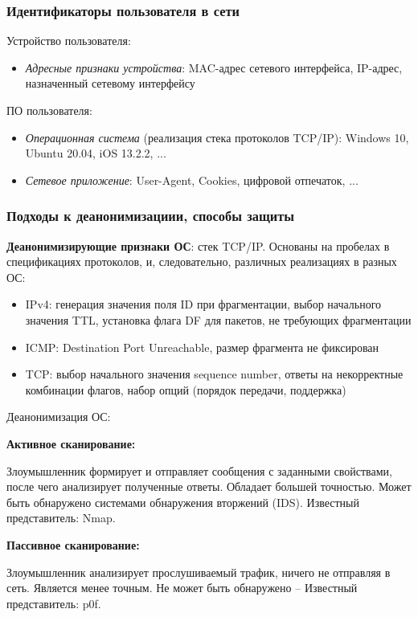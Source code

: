 \subsubsection{Идентификаторы пользователя в сети}

Устройство пользователя:
\begin{itemize}
    \item \textit{Адресные признаки устройства}: MAC-адрес сетевого интерфейса, IP-адрес, назначенный сетевому интерфейсу
\end{itemize}

ПО пользователя:
\begin{itemize}
    \item \textit{Операционная система} (реализация стека протоколов TCP/IP): Windows 10, Ubuntu 20.04, iOS 13.2.2, ...
    \item \textit{Сетевое приложение}: User-Agent, Cookies, цифровой отпечаток, ...
\end{itemize}

\subsubsection{Подходы к деанонимизациии, способы защиты}

\textbf{Деанонимизирующие признаки ОС}: стек TCP/IP. Основаны на пробелах в
спецификациях протоколов, и, следовательно, различных реализациях в разных ОС:
\begin{itemize}
    \item IPv4: генерация значения поля ID при фрагментации, выбор начального значения TTL, установка флага DF для пакетов, не требующих фрагментации
    \item ICMP: Destination Port Unreachable, размер фрагмента не фиксирован
    \item TCP: выбор начального значения sequence number, ответы на некорректные комбинации флагов, набор опций (порядок передачи, поддержка)
\end{itemize}

Деанонимизация ОС:

\textbf{Активное сканирование:}

Злоумышленник формирует и отправляет сообщения с заданными свойствами, после чего анализирует полученные ответы. Обладает большей точностью. Может быть обнаружено системами обнаружения вторжений (IDS). Известный представитель: Nmap.

\textbf{Пассивное сканирование:}

Злоумышленник анализирует прослушиваемый трафик, ничего не отправляя в сеть. Является менее точным. Не может быть обнаружено – Известный представитель: p0f.

